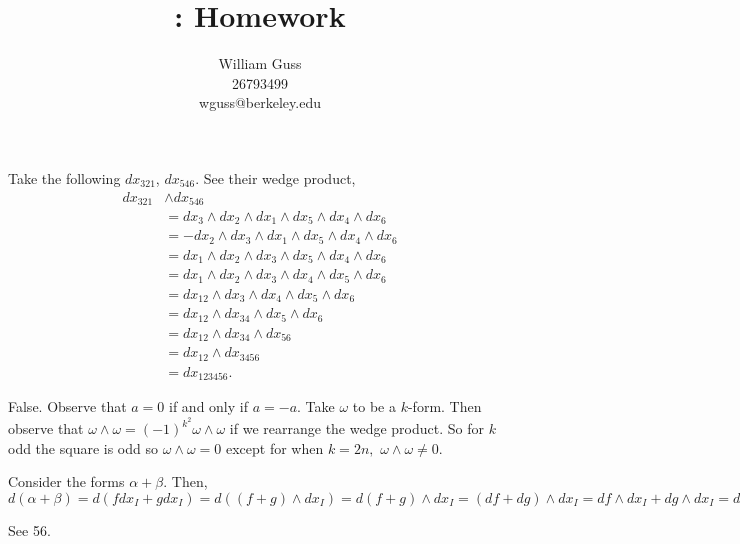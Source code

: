 \documentclass[letter]{article}
\title{\bCLASS: Homework \bHWN}
\author{William Guss\\26793499\\wguss@berkeley.edu}
\newenvironment{menumerate}{%
  \edef\backupindent{\the\parindent}%
  \enumerate%
  \setlength{\parindent}{\backupindent}%
}{\endenumerate}
\begin{document}
\maketitle
\thispagestyle{empty}


\begin{menumerate}
    \setcounter{enumi}{54}
    \item Take the following $dx_{321}$, $dx_{546}$. See their wedge product, 
    \begin{equation}
    \begin{aligned}
        dx_{321} &\wedge dx_{546} \\
        &= dx_{3} \wedge dx_{2} \wedge dx_{1} \wedge dx_{5} \wedge dx_{4} \wedge dx_{6} \\
        &= - dx_{2} \wedge dx_{3} \wedge dx_{1} \wedge dx_{5} \wedge dx_{4} \wedge dx_{6} \\
        &=  dx_{1} \wedge dx_{2} \wedge dx_{3} \wedge dx_{5} \wedge dx_{4} \wedge dx_{6} \\
        &= dx_{1} \wedge dx_{2} \wedge dx_{3} \wedge dx_{4} \wedge dx_{5} \wedge dx_{6} \\
        &=  dx_{12} \wedge dx_{3} \wedge dx_{4} \wedge dx_{5} \wedge dx_{6} \\
        &=  dx_{12} \wedge dx_{34} \wedge dx_{5} \wedge dx_{6} \\
        &=  dx_{12} \wedge dx_{34} \wedge dx_{56} \\
        &= dx_{12} \wedge dx_{3456} \\
        &= dx_{123456}.
    \end{aligned}
    \end{equation}
    \item False. Observe that $a = 0$ if and only if $a = -a.$ Take $\omega$ to be a $k$-form. Then observe that
    $\omega \wedge \omega = (-1)^{k^2} \omega \wedge \omega $ if we rearrange the wedge product. So for $k$ odd the square is odd 
    so $\omega \wedge \omega = 0$ except for when $k = 2n,$ $\omega \wedge \omega \neq 0.$
    \item Consider the forms $\alpha + \beta.$ Then, $d(\alpha + \beta) = d(fdx_I + g dx_I) = d((f + g)\wedge dx_I) = d(f+g) \wedge dx_I = (df + dg) \wedge dx_I
    = df\wedge dx_I + dg \wedge dx_I = d(\alpha) + d(\beta).$
    \item
    \item
    \item
    \item See 56.
\end{menumerate}

\end{document}
